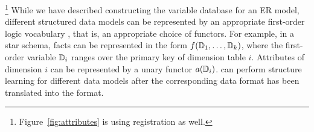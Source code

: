 \footnote{Figure~\ref{fig:attributes} is using registration as well.} While we have described constructing the variable database for an ER model, different structured data models can be represented by an appropriate first-order logic vocabulary \cite{Kimmig2015}, that is, an appropriate choice of functors. For example, in a star schema, facts can be represented in the form $f(\mathbb{D}_{1},\ldots,\mathbb{D}_{k})$, where the first-order variable $\mathbb{D}_{i}$ ranges over the primary key of dimension table $i$. Attributes of dimension $i$ can be represented by a unary functor $a(\mathbb{D}_{i})$. \FB can perform structure learning for different data models after the corresponding data format has been translated into the \RVD format.

%


